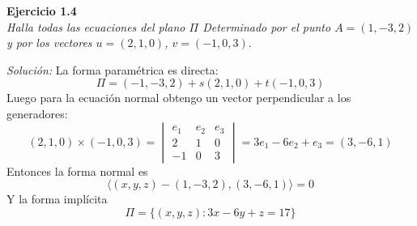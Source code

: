 \documentclass{article}
\newenvironment{problem}[2][Ejercicio]
    { \begin{mdframed}[backgroundcolor=gray!20] \textbf{#1 #2} \\}
    {  \end{mdframed}}
\newenvironment{solution}
    {\textit{Solución:}}
    {}
\begin{document}
    \begin{problem}{1.4}
    \emph{Halla todas las ecuaciones del plano $\Pi$ Determinado por el punto $A=(1,-3,2)$ y por los vectores $u=(2,1,0)$, $v=(-1,0,3)$}.
    \end{problem}
    \begin{solution}
    La forma paramétrica es directa:
    \[
    \Pi = (-1,-3,2) + s(2,1,0) + t(-1,0,3)
    \]
    Luego para la ecuación normal obtengo un vector perpendicular a los generadores:
    \[
    (2,1,0) \times (-1,0,3) = 
    \begin{vmatrix}
    e_1 & e_2 & e_3 \\
    2 & 1 & 0 \\
    -1 & 0 & 3
    \end{vmatrix} = 3e_1-6e_2+e_3 = (3,-6,1)
    \]
    Entonces la forma normal es
    \[
    \langle (x,y,z)-(1,-3,2), (3,-6,1) \rangle  = 0
    \]
    Y la forma implícita
    \[
    \Pi = \{ (x,y,z) :3x-6y+z = 17 \}
    \]
    \end{solution}

\end{document}
